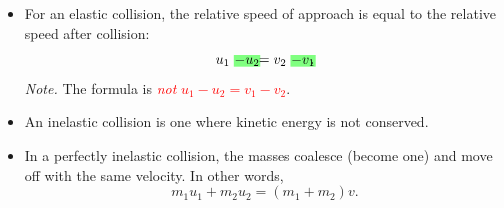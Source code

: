 \documentclass[oneside]{book}
\begin{document}
\begin{itemize}
\begin{table}[H]
\begin{tabular}{ScScSc}
            \bottomrule
        \end{tabular}
        \caption{Special cases of elastic collisions.}
        \label{table:elastic-collisions}
    \end{table}
    \item For an elastic collision, the relative speed of approach is equal to the relative speed after collision:
    \[u_1\highlight[green!50]{-u_2}=v_2\highlight[green!50]{-v_1}.\]
    \emph{Note.} The formula is \textcolor{red}{\emph{not} \(u_1-u_2=v_1-v_2\)}.
    \item An inelastic collision is one where kinetic energy is not conserved. 
    \item In a perfectly inelastic collision, the masses coalesce (become one) and move off with the same velocity. In other words,
    \[m_1u_1+m_2u_2=(m_1+m_2)v.\]
\end{itemize}
\end{document}
